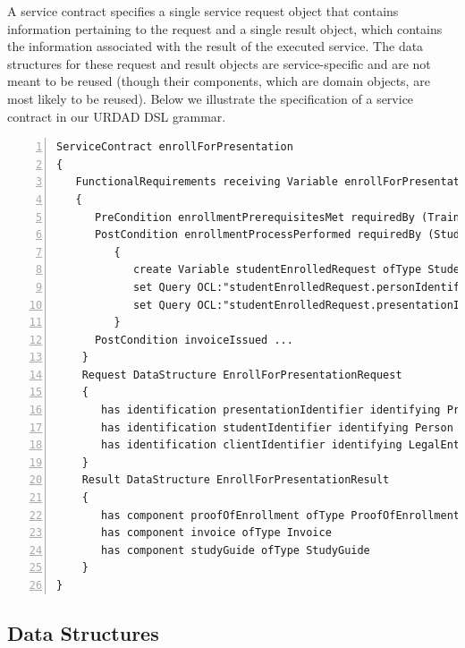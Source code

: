 A service contract specifies a single service request object that contains information pertaining to the request and a single result object, which contains the information associated with the result of the executed service. The data structures for these request and result objects are service-specific and are not meant to be reused (though their components, which are domain objects, are most likely to be reused). Below we illustrate the specification of a service contract in our URDAD DSL grammar.
\lstset{language=urdad,caption=Specifying a service contract in the textual URDAD DSL syntax.,label=contractTextSyntax}
\small \begin{lstlisting}[numbers=left,escapechar=|]
ServiceContract enrollForPresentation
{
   FunctionalRequirements receiving Variable enrollForPresentationRequest ofType EnrollForPresentationRequest
   {
      PreCondition enrollmentPrerequisitesMet requiredBy (TrainingRegulator Student) raises EnrollmentPrerequisitesNotSatisfiedException checks constraint enrollmentPrerequisitesForPresentationMet with ValueOf enrollForPresentationRequest
      PostCondition enrollmentProcessPerformed requiredBy (Student Client TrainingRegulator) ensures constraint studentEnrolledForPresentation          with ValueOf studentEnrolledRequest constructedUsing doSequential
         {
            create Variable studentEnrolledRequest ofType StudentEnrolledRequest
            set Query OCL:"studentEnrolledRequest.personIdentifier" equalTo Query OCL:"enrollForPresentationRequest.personIdentifier"                            
            set Query OCL:"studentEnrolledRequest.presentationIdentifier" equalTo Query OCL:"enrollForPresentationRequest.presentationIdentifier"                            
         }  
      PostCondition invoiceIssued ...
    }            
    Request DataStructure EnrollForPresentationRequest 
    {
       has identification presentationIdentifier identifying Presentation
       has identification studentIdentifier identifying Person
       has identification clientIdentifier identifying LegalEntity         
    }
    Result DataStructure EnrollForPresentationResult 
    {
       has component proofOfEnrollment ofType ProofOfEnrollment
       has component invoice ofType Invoice
       has component studyGuide ofType StudyGuide
    }
}
\end{lstlisting}\normalsize

\subsection{Data Structures}

